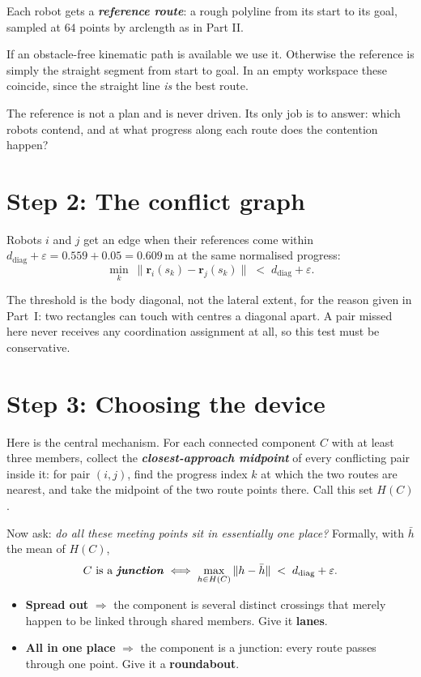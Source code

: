 \documentclass[11pt,a4paper]{article}
\newcommand{\defn}[1]{\textbf{\textit{#1}}}
\begin{document}
Each robot gets a \defn{reference route}: a rough polyline from its start to its goal,
sampled at $64$ points by arclength as in Part II.

If an obstacle-free kinematic path is available we use it. Otherwise the reference is simply
the straight segment from start to goal. In an empty workspace these coincide, since the
straight line \emph{is} the best route.

The reference is not a plan and is never driven. Its only job is to answer: which robots
contend, and at what progress along each route does the contention happen?

\section{Step 2: The conflict graph}
\label{sec:cgraph}

Robots $i$ and $j$ get an edge when their references come within
$d_{\mathrm{diag}} + \varepsilon = 0.559 + 0.05 = 0.609$\,m at the same normalised progress:
\[
\min_{k} \ \bigl\| \mathbf{r}_i(s_k) - \mathbf{r}_j(s_k) \bigr\| \;<\; d_{\mathrm{diag}} + \varepsilon .
\]

The threshold is the body diagonal, not the lateral extent, for the reason given in
Part~I: two rectangles can touch with centres a diagonal apart. A pair missed here never
receives any coordination assignment at all, so this test must be conservative.

\section{Step 3: Choosing the device}
\label{sec:device}

Here is the central mechanism. For each connected component $C$ with at least three
members, collect the \defn{closest-approach midpoint} of every conflicting pair inside it:
for pair $(i,j)$, find the progress index $k$ at which the two routes are nearest, and take
the midpoint of the two route points there. Call this set $H(C)$.

Now ask: \emph{do all these meeting points sit in essentially one place?} Formally, with
$\bar{h}$ the mean of $H(C)$,
\begin{equation}
C \text{ is a \defn{junction}} \iff
\max_{h \in H(C)} \|h - \bar{h}\| \;<\; d_{\mathrm{diag}} + \varepsilon .
\label{eq:hub}
\end{equation}

\begin{itemize}
\item \textbf{Spread out} $\Rightarrow$ the component is several distinct crossings that
merely happen to be linked through shared members. Give it \textbf{lanes}.
\item \textbf{All in one place} $\Rightarrow$ the component is a junction: every route
passes through one point. Give it a \textbf{roundabout}.
\end{itemize}
\end{document}
